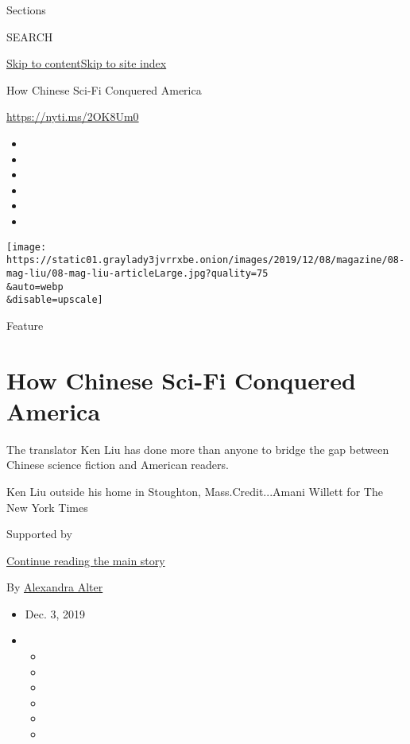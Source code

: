 Sections

SEARCH

\protect\hyperlink{site-content}{Skip to
content}\protect\hyperlink{site-index}{Skip to site index}

How Chinese Sci-Fi Conquered America

\url{https://nyti.ms/2OK8Um0}

\begin{itemize}
\item
\item
\item
\item
\item
\item
\end{itemize}

\texttt{[image: https://static01.graylady3jvrrxbe.onion/images/2019/12/08/magazine/08-mag-liu/08-mag-liu-articleLarge.jpg?quality=75\\\&auto=webp\\\&disable=upscale]}

Feature

\hypertarget{how-chinese-sci-fi-conquered-america}{%
\section{How Chinese Sci-Fi Conquered
America}\label{how-chinese-sci-fi-conquered-america}}

The translator Ken Liu has done more than anyone to bridge the gap
between Chinese science fiction and American readers.

Ken Liu outside his home in Stoughton, Mass.Credit...Amani Willett for
The New York Times

Supported by

\protect\hyperlink{after-sponsor}{Continue reading the main story}

By
\href{https://www.nytimes3xbfgragh.onion/by/alexandra-alter}{Alexandra
Alter}

\begin{itemize}
\item
  Dec. 3, 2019
\item
  \begin{itemize}
  \item
  \item
  \item
  \item
  \item
  \item
  \end{itemize}
\end{itemize}

